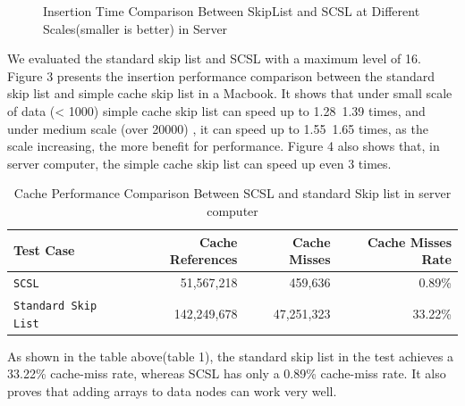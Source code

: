 \documentclass[sigconf, nonacm, letterpaper,top=2cm,bottom=2cm,left=3cm,right=3cm,marginparwidth=1.75cm]{acmart}
\begin{document}
\begin{figure}
\caption{Insertion Time Comparison Between SkipList and SCSL at Different Scales(smaller is better) in Server}
\end{figure}

We evaluated the standard skip list and SCSL with a maximum level of 16. Figure 3 presents the insertion performance comparison between the standard skip list and simple cache skip list in a Macbook. It shows that under small scale of data (< 1000) simple cache skip list can speed up to 1.28~1.39 times, and under medium scale (over 20000) , it can speed up to 1.55~1.65 times, as the scale increasing, the more benefit for performance. Figure 4 also shows that, in server computer, the simple cache skip list can speed up even 3 times.
\begin{table}[t]
\begin{tabular}{lrrr}
\toprule
Test Case & Cache References & Cache Misses & Cache Misses Rate \\
\midrule
\verb|SCSL| & 51,567,218 & 459,636 & 0.89\% \\
\verb|Standard Skip List| & 142,249,678 & 47,251,323 & 33.22\% \\
\bottomrule
\end{tabular}
\caption{Cache Performance Comparison Between SCSL and standard Skip list in server computer}
\end{table}
As shown in the table above(table 1), the standard skip list in the test achieves a 33.22\% cache-miss rate, whereas SCSL has only a 0.89\% cache-miss rate. It also proves that adding arrays to data nodes can work very well.
\end{document}

